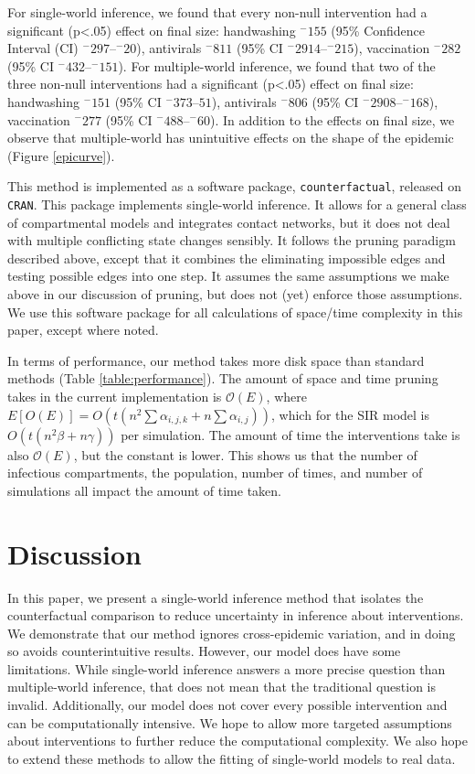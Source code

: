 \documentclass[openacc]{rsproca_new}%
\renewcommand{\neg}[1]{^{-}#1}
\begin{document}
For single-world inference, we found that every non-null intervention had a significant (p<.05) effect on final size: handwashing $\neg 155$ (95\% Confidence Interval (CI) $\neg 297$--$\neg 20$), antivirals $\neg 811$ (95\% CI $\neg 2914$--$\neg 215$), vaccination $\neg 282$ (95\% CI $\neg 432$--$\neg 151$).
For multiple-world inference, we found that two of the three non-null interventions had a significant (p<.05) effect on final size: handwashing $\neg 151$ (95\% CI $\neg 373$--$51$), antivirals $\neg 806$ (95\% CI $\neg 2908$--$\neg 168$), vaccination $\neg 277$ (95\% CI $\neg 488$--$\neg 60$).
In addition to the effects on final size, we observe that multiple-world has unintuitive effects on the shape of the epidemic (Figure \ref{epicurve}).

This method is implemented as a software package, \texttt{counterfactual}, released on \texttt{CRAN}. %
This package implements single-world inference. 
It allows for a general class of compartmental models and integrates contact networks, but it does not deal with multiple conflicting state changes sensibly.
It follows the pruning paradigm described above, except that it combines the eliminating impossible edges and testing possible edges into one step.
It assumes the same assumptions we make above in our discussion of pruning, but does not (yet) enforce those assumptions.
We use this software package for all calculations of space/time complexity in this paper, except where noted.

In terms of performance, our method takes more disk space than standard methods (Table \ref{table:performance}).
The amount of space and time pruning takes in the current implementation is $\mathcal O(E)$, where $E[O(E)] = O(t(n^2\sum \alpha_{i,j,k} + n \sum\alpha_{i,j}))$, which for the SIR model is $O(t(n^2\beta + n\gamma))$ per simulation.
The amount of time the interventions take is also $\mathcal O(E)$, but the constant is lower.
This shows us that the number of infectious compartments, the population, number of times, and number of simulations all impact the amount of time taken.

\section{Discussion}
In this paper, we present a single-world inference method that isolates the counterfactual comparison to reduce uncertainty in inference about interventions.
We demonstrate that our method ignores cross-epidemic variation, and in doing so avoids counterintuitive results.
However, our model does have some limitations.
While single-world inference answers a more precise question than multiple-world inference, that does not mean that the traditional question is invalid.
Additionally, our model does not cover every possible intervention and can be computationally intensive.
We hope to allow more targeted assumptions about interventions to further reduce the computational complexity.
We also hope to extend these methods to allow the fitting of single-world models to real data.
\end{document}
